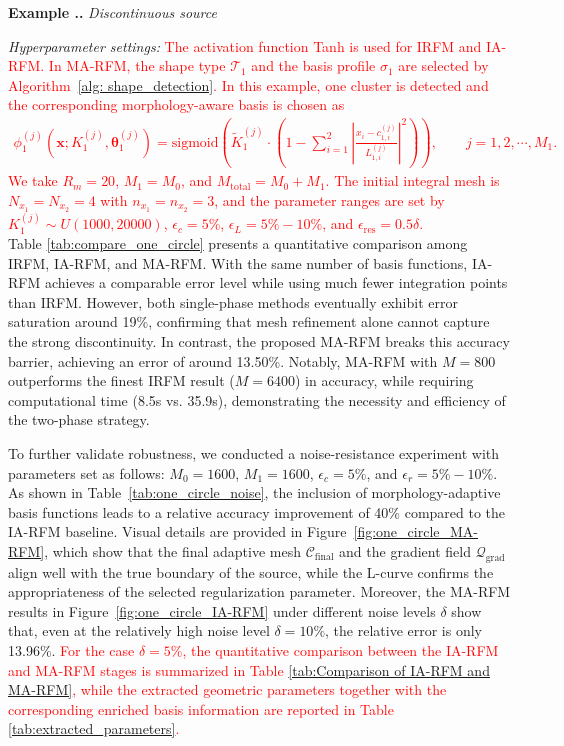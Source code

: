 \documentclass{article}
\newcommand{\red}[1]{\textcolor{red}{#1}}
\theoremstyle{plain}
\theoremstyle{definition}
\newcounter{example}[section]         %
\renewcommand{\theexample}{\thesection.\arabic{example}}
\newenvironment{example}[1][]{
    \refstepcounter{example}%
    \par\noindent\textbf{Example \theexample.} #1 \par
}{\par}
\begin{document}
{\begin{example}[\emph{Discontinuous source}]
 \noindent \emph{Hyperparameter settings:} \red{The activation function Tanh is used for IRFM and IA-RFM. In MA-RFM, the shape type $\mathcal{T}_1$ and the basis profile $\sigma_1$ are selected by Algorithm~\ref{alg:
  shape_detection}. In this example, one cluster is detected and the corresponding morphology-aware basis is chosen as
  \begin{align}
  \label{one_circle}
      \phi_1^{(j)}(\boldsymbol{x};K_1^{(j)},\boldsymbol{\theta}_1^{(j)})
      =
      \text{sigmoid}\left(
      \tilde{K}_1^{(j)}
      \cdot
      \left(
      1-\sum_{i=1}^2\left|\frac{x_i-c_{1,i}^{(j)}}{L_{1,i}^{(j)}}\right|^2
      \right)
      \right),
      \qquad j=1,2,\cdots,M_1.
  \end{align}
  We take $R_m=20$, $M_1=M_0$, and $M_{\text{total}}=M_0+M_1$. The initial integral mesh is $N_{x_1}=N_{x_2}=4$ with $n_{x_1}=n_{x_2}=3$, and the parameter ranges are set by $K_1^{(j)}\sim U(1000,20000)$, $\epsilon_c=5\%$, $
  \epsilon_L=5\%-10\%$, and $\epsilon_{\text{res}}=0.5\delta$.}\\

 {Table \ref{tab:compare_one_circle} presents a quantitative comparison among IRFM, IA-RFM, and MA-RFM.
 With the same number of basis functions, IA-RFM achieves a comparable error level while using much fewer integration points than IRFM.
However, both single-phase methods eventually exhibit error saturation around 19\%, confirming that mesh refinement alone cannot capture the strong discontinuity. 
In contrast, the proposed MA-RFM breaks this accuracy barrier, achieving an error of around 13.50\%. Notably, MA-RFM with $M=800$ outperforms the finest IRFM result ($M=6400$) in accuracy, while requiring computational time (8.5s vs. 35.9s), demonstrating the necessity and efficiency of the two-phase strategy.}

  To further validate robustness, we conducted a noise-resistance experiment with parameters set as follows: $M_0=1600$, $M_1=1600$, $\epsilon_c=5\%$, and $\epsilon_r=5\%-10\%$. As shown in Table~\ref{tab:one_circle_noise}, the
  inclusion of morphology-adaptive basis functions leads to a relative accuracy improvement of 40\% compared to the IA-RFM baseline. Visual details are provided in Figure~\ref{fig:one_circle_MA-RFM}, which show that the final
  adaptive mesh $\mathcal{C}_{\text{final}}$ and the gradient field $\mathcal{Q}_{\text{grad}}$ align well with the true boundary of the source, while the L-curve confirms the appropriateness of the selected regularization
  parameter. Moreover, the MA-RFM results in Figure~\ref{fig:one_circle_IA-RFM} under different noise levels $\delta$ show that, even at the relatively high noise level $\delta=10\%$, the relative error is only 13.96\%. \red{For the
  case $\delta=5\%$, the quantitative comparison between the IA-RFM and MA-RFM stages is summarized in Table \ref{tab:Comparison of IA-RFM and MA-RFM}, while the extracted geometric parameters together with the corresponding enriched basis information are reported in
  Table \ref{tab:extracted_parameters}.} \\



\end{example}}
\end{document}
